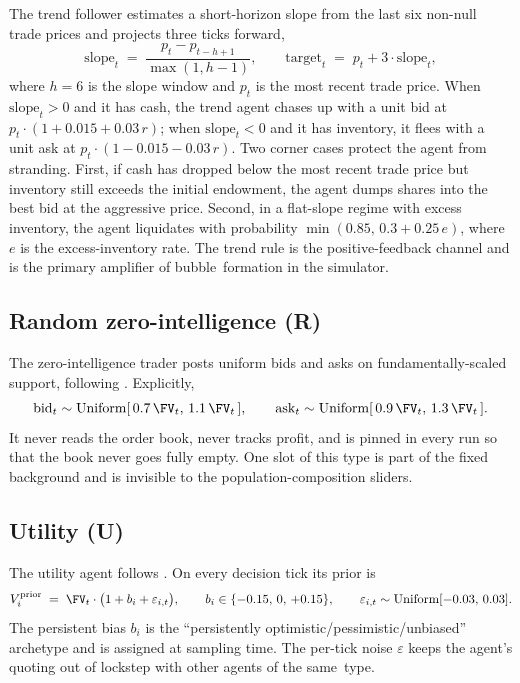 The trend follower estimates a short-horizon slope from the last
six non-null trade prices and projects three ticks forward,
\begin{equation}
\text{slope}_t\;=\;\frac{p_{t}-p_{t-h+1}}{\max(1,h-1)},\qquad
\text{target}_t\;=\;p_t+3\cdot\text{slope}_t,
\label{eq:trend}
\end{equation}
where $h=6$ is the slope window and $p_t$ is the most recent trade
price. When $\text{slope}_t>0$ and it has cash, the trend agent
chases up with a unit bid at $p_t\cdot(1+0.015+0.03\,r)$; when
$\text{slope}_t<0$ and it has inventory, it flees with a unit ask
at $p_t\cdot(1-0.015-0.03\,r)$. Two corner cases protect the agent
from stranding. First, if cash has dropped below the most recent
trade price but inventory still exceeds the initial endowment, the
agent dumps shares into the best bid at the aggressive price.
Second, in a flat-slope regime with excess inventory, the agent
liquidates with probability $\min(0.85,\,0.3+0.25\,e)$, where $e$
is the excess-inventory rate. The trend rule is the positive-feedback
channel \citep{delong1990positive} and is the primary amplifier of
bubble~formation in the simulator.

\subsection{Random zero-intelligence (R)}

The zero-intelligence trader posts uniform bids and asks on
fundamentally-scaled support, following
\citet{gode1993allocative}. Explicitly,
\begin{equation}
\text{bid}_t\sim\text{Uniform}[\,0.7\,\FV_t,\,1.1\,\FV_t\,],\qquad
\text{ask}_t\sim\text{Uniform}[\,0.9\,\FV_t,\,1.3\,\FV_t\,].
\label{eq:random}
\end{equation}
It never reads the order book, never tracks profit, and is pinned
in every run so that the book never goes fully empty. One slot of
this type is part of the fixed background and is invisible to the
population-composition sliders.

\subsection{Utility (U)}
\label{sec:util-agent}

The utility agent follows \citet{lopezlira2025llm}. On every
decision tick its prior is
\begin{equation}
V_i^{\text{prior}}\;=\;\FV_t\cdot\bigl(1+b_i+\varepsilon_{i,t}\bigr),\qquad
b_i\in\{-0.15,\,0,\,+0.15\},\qquad
\varepsilon_{i,t}\sim\text{Uniform}[-0.03,\,0.03].
\label{eq:util_prior}
\end{equation}
The persistent bias $b_i$ is the ``persistently
optimistic/pessimistic/unbiased'' archetype and is assigned at
sampling time. The per-tick noise $\varepsilon$ keeps the agent's
quoting out of lockstep with other agents of the same~type.

